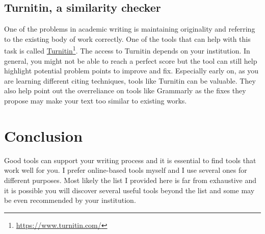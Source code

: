 \subsection{Turnitin, a similarity checker}

One of the problems in academic writing is maintaining originality and referring to the existing body of work correctly.
One of the tools that can help with this task is called \href{https://www.turnitin.com/}{Turnitin}\footnote{\url{https://www.turnitin.com/}}.
The access to Turnitin depends on your institution. In general, you might not be able to reach a perfect score but the tool can still help highlight potential problem points to improve and fix.
Especially early on, as you are learning different citing techniques, tools like Turnitin can be valuable.
They also help point out the overreliance on tools like Grammarly as the fixes they propose may make your text too similar to existing works.


\section{Conclusion}

Good tools can support your writing process and it is essential to find tools that work well for you.
I prefer online-based tools myself and I use several ones for different purposes. Most likely the list I provided here is far from exhaustive and it is possible you will discover several useful tools beyond the list and some may be even recommended by your institution.
